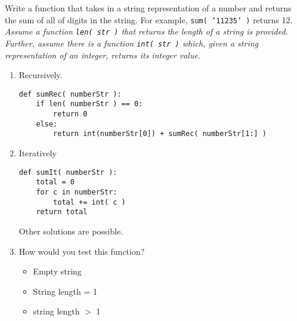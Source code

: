 Write a function that takes in a string representation of a number and returns the sum
        of all of digits in the string. For example, \texttt{sum( '11235' )} returns 12. \\
        \emph{Assume a function \texttt{len( str )} that returns the length of a string is provided. \\
         Further, assume there is a function \texttt{int( str )} which, given a string representation of an integer, returns its integer value.}

        \begin{enumerate}
            \item Recursively. 
\begin{answer}
\begin{lstlisting}
def sumRec( numberStr ):
    if len( numberStr ) == 0:
        return 0
    else:
        return int(numberStr[0]) + sumRec( numberStr[1:] )
\end{lstlisting}
\end{answer}

            \item Iteratively
\begin{answer}
\begin{lstlisting}
def sumIt( numberStr ):
    total = 0
    for c in numberStr:
        total += int( c )
    return total
\end{lstlisting}
Other solutions are possible.
\end{answer}
            \vspace{.25in}
    		\item How would you test this function?
                \begin{answer}
                \begin{itemize}
                    \item Empty string 
                    \item String length = 1
                    \item string length $>$ 1
                \end{itemize}
                \end{answer}
\end{enumerate}
